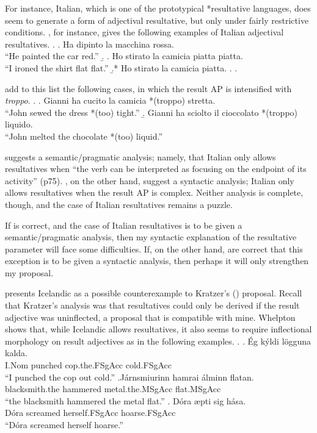 For instance, Italian, which is one of the prototypical *resultative languages, does seem to generate a form of adjectival resultative, but only under fairly restrictive conditions.
\textcite{napoli1992secondary}, for instance, gives the following examples of Italian adjectival resultatives.
\ex.
\a. Ha dipinto la macchina rossa.\\
``He painted the car red.''
\b. 
	\a. Ho stirato la camicia piatta piatta.\\
	``I ironed the shirt flat flat.''
	\b.* Ho stirato la camicia piatta.
	\z.
\z.

\textcite{folli2005prepositions} add to this list the following cases, in which the result AP is intensified with \textit{troppo}.
\ex.
\a. Gianni ha cucito la camicia *(troppo) stretta.\\
``John sewed the dress *(too) tight.''
\b. Gianni ha sciolto il cioccolato *(troppo) liquido.\\
``John melted the chocolate *(too) liquid.''

\textcite{napoli1992secondary} suggests a semantic/pragmatic analysis; namely, that Italian only allows resultatives when ``the verb can be interpreted as focusing on the endpoint of its activity'' (p75).
\textcite{folli2005prepositions}, on the other hand, suggest a syntactic analysis; Italian only allows resultatives when the result AP is complex.
Neither analysis is complete, though, and the case of Italian resultatives remains a puzzle.

If \citeauthor{napoli1992secondary} is correct, and the case of Italian resultatives is to be given a semantic/pragmatic analysis, then my syntactic explanation of the resultative parameter will face some difficulties.
If, on the other hand, \citeauthor{folli2005prepositions} are correct that this exception is to be given a syntactic analysis, then perhaps it will only strengthen my proposal.

\textcite{whelpton2007building} presents Icelandic as a possible counterexample to Kratzer's (\citeyear{kratzer2004building}) proposal. 
Recall that Kratzer's analysis was that resultatives could only be derived if the result adjective was uninflected, a proposal that is compatible with mine.
Whelpton shows that, while Icelandic allows resultatives, it also seems to require inflectional morphology on result adjectives as in the following examples.
\ex.
\ag. \'Eg k\'yldi l\"ogguna kalda.\\
I.Nom punched cop.the.FSgAcc cold.FSgAcc\\
``I punched the cop out cold.''
\bg.J\'{a}rnsmi\dh{}urinn hamra\dh{}i \'{a}lminn flatan.\\
blacksmith.the hammered metal.the.MSgAcc flat.MSgAcc\\
``the blacksmith hammered the metal flat.''
\bg. D\'{o}ra \ae{}pti sig h\'{a}sa.\\
D\'{o}ra screamed herself.FSgAcc hoarse.FSgAcc\\
``D\'{o}ra screamed herself hoarse.''

